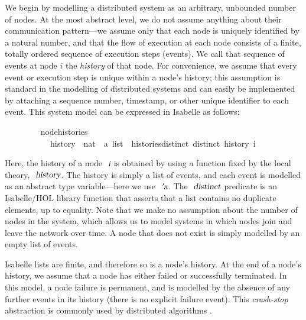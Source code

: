 We begin by modelling a distributed system as an arbitrary, unbounded number of nodes.
At the most abstract level, we do not assume anything about their communication pattern---we assume only that each node is uniquely identified by a natural number, and that the flow of execution at each node consists of a finite, totally ordered sequence of execution steps (events).
We call that sequence of events at node $i$ the \emph{history} of that node.
For convenience, we assume that every event or execution step is unique within a node's history; this assumption is standard in the modelling of distributed systems \cite{Cachin:2011wt} and can easily be implemented by attaching a sequence number, timestamp, or other unique identifier to each event.
This system model can be expressed in Isabelle as follows:
\vspace{0.375em}
\begin{isabellebody}
\ \ \ \ \ \ \ \  node{\isacharunderscore}histories\ {\isacharequal}\ \isanewline
\ \ \ \ \ \ \ \ \ \ \ history\ {\isacharcolon}{\isacharcolon}\ {\isachardoublequoteopen}nat\ {\isasymRightarrow}\ {\isacharprime}a\ list{\isachardoublequoteclose}\ \ histories{\isacharunderscore}distinct{\isacharcolon}\ {\isachardoublequoteopen}distinct\ {\isacharparenleft}history\ i{\isacharparenright}{\isachardoublequoteclose}
\end{isabellebody}
\vspace{0.375em}
Here, the history of a node $\isa{i}$ is obtained by using a function fixed by the local theory, $\isa{history}$.
The history is simply a list of events, and each event is modelled as an abstract type variable---here we use $\isa{{\isacharprime}a}$.
The $\isa{distinct}$ predicate is an Isabelle/HOL library function that asserts that a list contains no duplicate elements, up to equality.
Note that we make no assumption about the number of nodes in the system, which allows us to model systems in which nodes join and leave the network over time.
A node that does not exist is simply modelled by an empty list of events.

Isabelle lists are finite, and therefore so is a node's history.
At the end of a node's history, we assume that a node has either failed or successfully terminated.
In this model, a node failure is permanent, and is modelled by the absence of any further events in its history (there is no explicit failure event).
This \emph{crash-stop} abstraction is commonly used by distributed algorithms \cite{Cachin:2011wt}.

